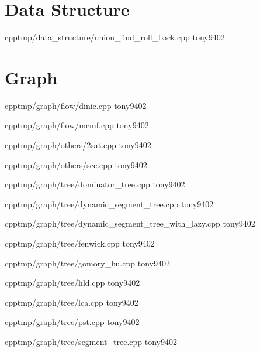 \section{Data Structure}


{}
{}
{}
{cpp}{tmp/data_structure/union_find_roll_back.cpp}
{tony9402}


\section{Graph}


{}
{}
{}
{cpp}{tmp/graph/flow/dinic.cpp}
{tony9402}



{}
{}
{}
{cpp}{tmp/graph/flow/mcmf.cpp}
{tony9402}



{}
{}
{}
{cpp}{tmp/graph/others/2sat.cpp}
{tony9402}



{}
{}
{}
{cpp}{tmp/graph/others/scc.cpp}
{tony9402}



{}
{}
{}
{cpp}{tmp/graph/tree/dominator_tree.cpp}
{tony9402}



{}
{}
{}
{cpp}{tmp/graph/tree/dynamic_segment_tree.cpp}
{tony9402}



{}
{}
{}
{cpp}{tmp/graph/tree/dynamic_segment_tree_with_lazy.cpp}
{tony9402}



{}
{}
{}
{cpp}{tmp/graph/tree/fenwick.cpp}
{tony9402}



{}
{}
{}
{cpp}{tmp/graph/tree/gomory_hu.cpp}
{tony9402}



{}
{}
{}
{cpp}{tmp/graph/tree/hld.cpp}
{tony9402}



{}
{}
{}
{cpp}{tmp/graph/tree/lca.cpp}
{tony9402}



{}
{}
{}
{cpp}{tmp/graph/tree/pst.cpp}
{tony9402}



{}
{}
{}
{cpp}{tmp/graph/tree/segment_tree.cpp}
{tony9402}



